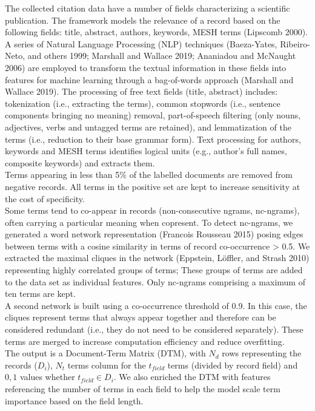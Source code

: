 \documentclass{article}
\begin{document}
The collected citation data have a number of fields characterizing a
scientific publication. The framework models the relevance of a record
based on the following fields: title, abstract, authors, keywords, MESH
terms (Lipscomb 2000). A series of Natural Language Processing (NLP)
techniques (Baeza-Yates, Ribeiro-Neto, and others 1999; Marshall and
Wallace 2019; Ananiadou and McNaught 2006) are employed to transform the
textual information in these fields into features for machine learning
through a bag-of-words approach (Marshall and Wallace 2019). The
processing of free text fields (title, abstract) includes: tokenization
(i.e., extracting the terms), common stopwords (i.e., sentence
components bringing no meaning) removal, part-of-speech filtering (only
nouns, adjectives, verbs and untagged terms are retained), and
lemmatization of the terms (i.e., reduction to their base grammar form).
Text processing for authors, keywords and MESH terms identifies logical
units (e.g., author's full names, composite keywords) and extracts
them.\\
Terms appearing in less than 5\% of the labelled documents are removed
from negative records. All terms in the positive set are kept to
increase sensitivity at the cost of specificity.\\
Some terms tend to co-appear in records (non-consecutive ngrams,
nc-ngrams), often carrying a particular meaning when copresent. To
detect nc-ngrams, we generated a word network representation (Francois
Rousseau 2015) posing edges between terms with a cosine similarity in
terms of record co-occurrence \textgreater{} 0.5. We extracted the
maximal cliques in the network (Eppstein, Löffler, and Strash 2010)
representing highly correlated groups of terms; These groups of terms
are added to the data set as individual features. Only nc-ngrams
comprising a maximum of ten terms are kept.\\
A second network is built using a co-occurrence threshold of 0.9. In
this case, the cliques represent terms that always appear together and
therefore can be considered redundant (i.e., they do not need to be
considered separately). These terms are merged to increase computation
efficiency and reduce overfitting.\\
The output is a Document-Term Matrix (DTM), with \(N_d\) rows
representing the records (\(D_i\)), \(N_t\) terms column for the
\(t_{field}\) terms (divided by record field) and \({0,1}\) values
whether \(t_{field} \in D_i\). We also enriched the DTM with features
referencing the number of terms in each field to help the model scale
term importance based on the field length.
\end{document}
